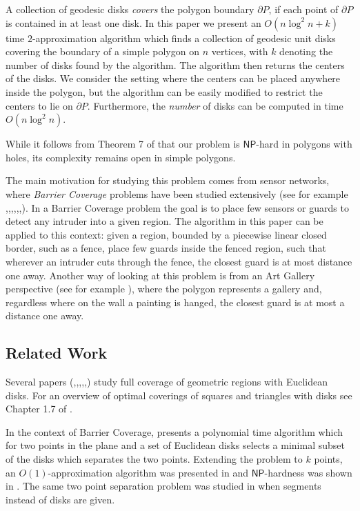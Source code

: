 \documentclass{llncs}
\begin{document}
A collection of geodesic disks \emph{covers} the polygon boundary $\partial P$, if each point of $\partial P$ is contained in at least one disk. In this paper we present an $O(n \log^2 n + k)$ time $2$-approximation algorithm which finds a collection of geodesic unit disks covering the boundary of a simple polygon on $n$ vertices, with $k$ denoting the number of disks found by the algorithm. The algorithm then returns the centers of the disks. {We consider the setting where the centers can be placed anywhere inside the polygon, but the algorithm can be easily modified to restrict the centers to lie on $\partial P$.}  Furthermore, the \emph{number} of disks can be computed in time $O(n \log^2 n)$.

  
While it follows from Theorem 7 of \cite{viganPack} that our problem is $\mathsf{NP}$-hard in polygons with holes, its complexity remains open in simple polygons.

The main motivation for studying this problem comes from sensor networks, where {\emph{Barrier Coverage} problems have been studied extensively} (see for example \cite{conf/algosensors/BeregK09},\cite{5210107},\cite{Chen:2008:MGQ:1374618.1374674},\cite{Kumar:20059},\cite{Liu:2008:SBC:1374618.1374673},\cite{conf/infocom/SaipullaWLW09},\cite{4520201}). In a Barrier Coverage problem the goal is to place few sensors or guards to detect any intruder into a given region. {The algorithm in this paper can be applied to this context}: given a region, bounded by a piecewise linear closed border, such as a fence, place few guards inside the fenced region, such that wherever an intruder cuts through the fence, the closest guard is at most distance one away. Another way of looking at this problem is from an Art Gallery perspective (see for example \cite{ORourke:1987:AGT:40599}), where the polygon represents a gallery and, regardless where on the wall a painting is hanged, the closest guard is at most a distance one away.


\subsection{Related Work}
Several papers (\cite{Funke:2007},\cite{Huang:2003},\cite{1939},\cite{ijdsn/Ko12},\cite{936985},\cite{6226360}) study full coverage of geometric regions with Euclidean disks. For an overview of optimal coverings of squares and triangles with disks see Chapter 1.7  of \cite{unsolv2}. 

In the context of Barrier Coverage, \cite{Cabello:2013:CSP:2462356.2462383} presents a polynomial time algorithm which for two points in the plane and a set of Euclidean disks selects a minimal subset of the disks which separates the two points. Extending the problem to $k$ points, an $O(1)$-approximation algorithm was presented in \cite{Gibson:2011:IPU:2040572.2040580} and $\mathsf{NP}$-hardness was shown in \cite{DBLP:journals/corr/abs-1303-2779}. The same two point separation problem was studied in \cite{minCellCon} when segments instead of disks are given.
\end{document}
